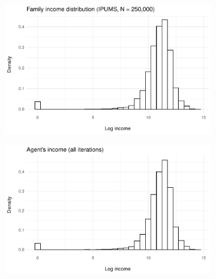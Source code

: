 \begin{figure}[htp]
    \caption{Individual income distribution (30 replicates)}\vspace{5mm}
    \label{ch04:income_distribution}
     \centering
     \begin{subfigure}[b]{0.45\textwidth}
         \includegraphics[width=\textwidth]{plots/verification/income/income_ipums.pdf}
     \end{subfigure}
     \begin{subfigure}[b]{0.45\textwidth}
         \centering
         \includegraphics[width=\textwidth]{plots/verification/income/income_mia.pdf}
     \end{subfigure}
\end{figure}
